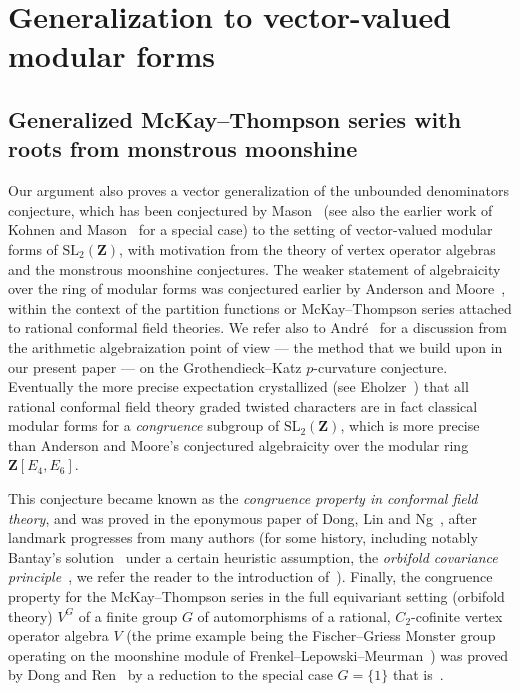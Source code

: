 \documentclass[10pt]{amsart}
\def\Z{\mathbf{Z}}
\theoremstyle{remark}
\numberwithin{equation}{subsection}
\def\SL{\mathrm{SL}}
\begin{document}
\section{Generalization to vector-valued modular forms} \label{vvmf}


\subsection{Generalized McKay--Thompson series with roots from monstrous moonshine}  \label{cft}
Our argument also proves a vector generalization of the unbounded denominators conjecture, which has been conjectured by Mason~\cite{MasonConjectured} (see also the earlier work of Kohnen and Mason~\cite{KohnenMason} for a special case) to the setting of vector-valued modular forms of $\SL_2(\Z)$, with motivation from the theory of vertex operator algebras and the monstrous moonshine conjectures. The weaker statement  of algebraicity over the ring of modular forms was conjectured earlier by Anderson and Moore~\cite{AndersonMoore}, within the context of the partition functions or McKay--Thompson series attached to rational conformal field theories. We refer also to Andr\'e~\cite[Appendix]{Andre} for a discussion from the arithmetic algebraization point of view --- the method that we build upon in our present paper --- on the Grothendieck--Katz $p$-curvature conjecture. Eventually the more precise
expectation crystallized (see Eholzer~\cite[\emph{Conjecture} on page~628]{Eholzer})  that all rational
conformal field theory graded twisted characters are in fact classical modular forms for a  \emph{congruence} subgroup of $\SL_2(\Z)$, which is more precise than Anderson and Moore's conjectured algebraicity over the modular ring $\Z[E_4, E_6]$.

 This conjecture became known as the \emph{congruence property in conformal field theory}, and was proved  in the eponymous paper of Dong, Lin and Ng~\cite{DongLinNg}, after  landmark progresses  from many authors (for some history, including notably Bantay's solution~\cite{Bantay} under a certain heuristic assumption, the \emph{orbifold covariance principle}~\cite{BantayCov, BantayPerm, Xu},  we refer the reader to the introduction of~\cite{DongLinNg}). Finally, the congruence property for the McKay--Thompson series in the full equivariant setting (orbifold theory) $V^G$ of a finite group $G$ of automorphisms of a rational, $C_2$-cofinite vertex operator algebra $V$ (the prime example being  the Fischer--Griess Monster group operating on the moonshine module of Frenkel--Lepowski--Meurman~\cite{FLM}) was
 proved  by Dong and Ren~\cite{DongRen} by a reduction to the special case $G = \{1\}$ that is~\cite{DongLinNg}. 
\end{document}
